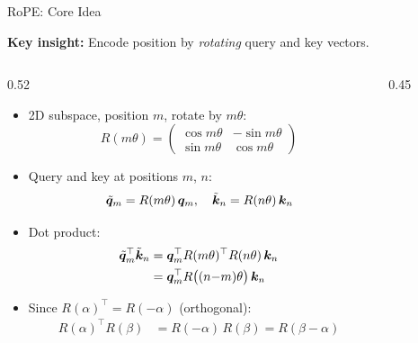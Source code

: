 \begin{frame}{RoPE: Core Idea~\cite{su2024roformer}}

  \textbf{Key insight:} Encode position by \emph{rotating} query and key vectors.

  \vspace{0.3em}
  \begin{columns}[T]
    \begin{column}{0.52\textwidth}
      \begin{itemize}
        \item 2D subspace, position $m$, rotate by $m\theta$:
          \[
            R(m\theta) = \begin{pmatrix} \cos m\theta & -\sin m\theta \\ \sin m\theta & \cos m\theta \end{pmatrix}
          \]
          \vspace{-0.8em}
        \item Query and key at positions $m$, $n$:
          \[
            \tilde{{\boldsymbol{q}}}_m = R(m\theta)\,{\boldsymbol{q}}_m, \quad \tilde{{\boldsymbol{k}}}_n = R(n\theta)\,{\boldsymbol{k}}_n
          \]
          \vspace{-0.8em}
        \item Dot product:
          \vspace{-0.3em}
          \begin{align*}
            \tilde{{\boldsymbol{q}}}_m^\top \tilde{{\boldsymbol{k}}}_n &= {\boldsymbol{q}}_m^\top R(m\theta)^\top R(n\theta)\,{\boldsymbol{k}}_n \\
            &= {\boldsymbol{q}}_m^\top R\bigl((n{-}m)\theta\bigr)\,{\boldsymbol{k}}_n
          \end{align*}
          \vspace{-0.8em}
        \item Since $R(\alpha)^\top = R(-\alpha)$ (orthogonal):
          \vspace{-0.3em}
          \begin{align*}
            R(\alpha)^\top R(\beta) &= R(-\alpha)\,R(\beta) = R(\beta - \alpha)
          \end{align*}
      \end{itemize}
    \end{column}

    \begin{column}{0.45\textwidth}
      \begin{center}
\end{center}
\end{column}
\end{columns}
\end{frame}

